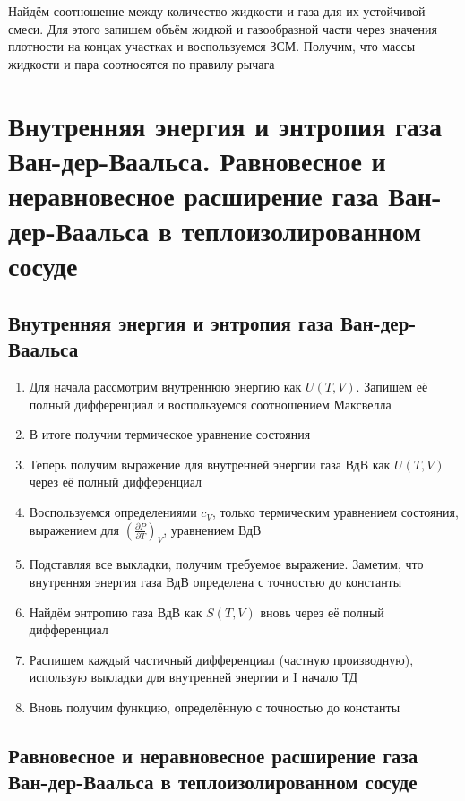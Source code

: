 \documentclass[a4paper, 14pt]{article}
\begin{document}
    Найдём соотношение между количество жидкости и газа для их устойчивой смеси.
    Для этого запишем объём жидкой и газообразной части через значения плотности на концах участках и воспользуемся ЗСМ.
    Получим, что массы жидкости и пара соотносятся по правилу рычага

    \section{Внутренняя энергия и энтропия газа Ван-дер-Ваальса.
    Равновесное и неравновесное расширение газа Ван-дер-Ваальса в теплоизолированном сосуде}

    \subsection{Внутренняя энергия и энтропия газа Ван-дер-Ваальса}

    \begin{enumerate}
        \item Для начала рассмотрим внутреннюю энергию как $U(T, V)$.
        Запишем её полный дифференциал и воспользуемся соотношением Максвелла
        \item В итоге получим термическое уравнение состояния
        \item Теперь получим выражение для внутренней энергии газа ВдВ как $U(T, V)$ через её полный дифференциал
        \item Воспользуемся определениями $c_V$, только термическим уравнением состояния, выражением для
        $(\frac{\partial P}{\partial T})_V$, уравнением ВдВ
        \item Подставляя все выкладки, получим требуемое выражение.
        Заметим, что внутренняя энергия газа ВдВ определена с точностью до константы
        \item Найдём энтропию газа ВдВ как $S(T, V)$ вновь через её полный дифференциал
        \item Распишем каждый частичный дифференциал (частную производную), использую выкладки для внутренней энергии
        и I начало ТД
        \item Вновь получим функцию, определённую с точностью до константы
    \end{enumerate}

    \subsection{Равновесное и неравновесное расширение газа Ван-дер-Ваальса в теплоизолированном сосуде}
\end{document}
